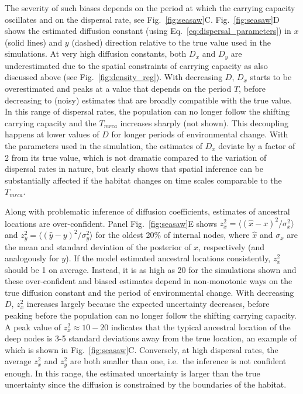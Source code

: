 \documentclass[aps,rmp, twocolumn]{revtex4}
\begin{document}
The severity of such biases depends on the period at which the carrying capacity oscillates and on the dispersal rate, see  Fig.~\ref{fig:seasaw}C.
Fig.~\ref{fig:seasaw}D shows the estimated diffusion constant (using Eq.~\ref{eq:dispersal_parameters}) in $x$ (solid lines) and $y$ (dashed) direction relative to the true value used in the simulations.
At very high diffusion constants, both $D_x$ and $D_y$ are underestimated due to the spatial constraints of carrying capacity as also discussed above (see Fig.~\ref{fig:density_reg}).
With decreasing $D$, $D_x$ starts to be overestimated and peaks at a value that depends on the period $T$, before decreasing to (noisy) estimates that are broadly compatible with the true value.
In this range of dispersal rates, the population can no longer follow the shifting carrying capacity and the $T_{mrca}$ increases sharply (not shown).
This decoupling happens at lower values of $D$ for longer periods of environmental change.
With the parameters used in the simulation, the estimates of $D_x$ deviate by a factor of 2 from its true value, which is not dramatic compared to the variation of dispersal rates in nature, but clearly shows that spatial inference can be substantially affected if the habitat changes on time scales comparable to the $T_{mrca}$.

Along with problematic inference of diffusion coefficients, estimates of ancestral locations are over-confident.
Panel Fig.~\ref{fig:seasaw}E shows $z_x^2 = \langle (\hat{x} - x)^2/\sigma_x^2 \rangle$ and $z_y^2=\langle (\hat{y} - y)^2/\sigma_y^2\rangle$ for the oldest 20\% of internal nodes, where $\hat{x}$ and $\sigma_x$ are the mean and standard deviation of the posterior of $x$, respectively (and analogously for $y$).
If the model estimated ancestral locations consistently, $z_x^2$ should be 1 on average.
Instead, it is as high as 20 for the simulations shown and these over-confident and biased estimates depend in non-monotonic ways on the true diffusion constant and the period of environmental change.
With decreasing $D$, $z_x^2$ increases largely because the expected uncertainty decreases, before peaking before the population can no longer follow the shifting carrying capacity.
A peak value of $z_x^2\approx 10-20$ indicates that the typical ancestral location of the deep nodes is 3-5 standard deviations away from the true location, an example of which is shown in Fig.~\ref{fig:seasaw}C.
Conversely, at high dispersal rates, the average $z_x^2$ and $z_y^2$ are both smaller than one, i.e.~the inference is not confident enough.
In this range, the estimated uncertainty is larger than the true uncertainty since the diffusion is constrained by the boundaries of the habitat.
\end{document}
